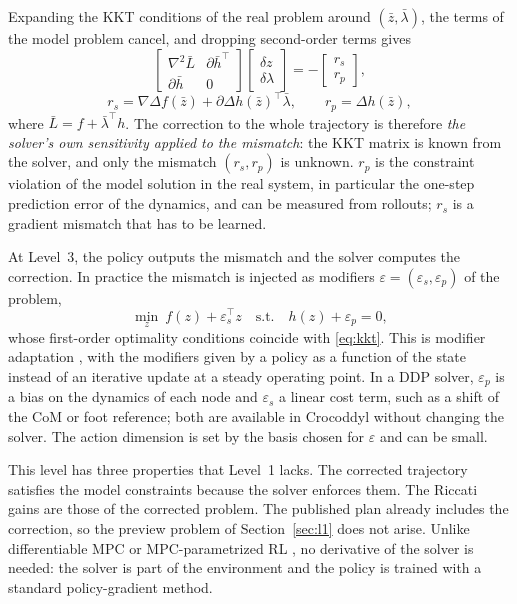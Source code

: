 \documentclass[conference]{IEEEtran}
\newcommand{\T}{^{\top}}
\newcommand{\zb}{\bar{z}}
\newcommand{\lb}{\bar{\lambda}}
\begin{document}
Expanding the KKT conditions of the real problem around $(\zb,\lb)$, the terms of the model problem cancel, and dropping second-order terms gives
\begin{equation}
\begin{bmatrix}\nabla^2\bar L&\partial\bar h\T\\ \partial\bar h&0\end{bmatrix}
\begin{bmatrix}\delta z\\ \delta\lambda\end{bmatrix}
=-\begin{bmatrix}r_s\\ r_p\end{bmatrix},
\label{eq:kkt}
\end{equation}
\begin{equation}
r_s=\nabla\Delta f(\zb)+\partial\Delta h(\zb)\T\lb,\qquad r_p=\Delta h(\zb),
\end{equation}
where $\bar L=f+\lb\T h$.
The correction to the whole trajectory is therefore \emph{the solver's own sensitivity applied to the mismatch}: the KKT matrix is known from the solver, and only the mismatch $(r_s,r_p)$ is unknown.
$r_p$ is the constraint violation of the model solution in the real system, in particular the one-step prediction error of the dynamics, and can be measured from rollouts; $r_s$ is a gradient mismatch that has to be learned.

At Level~3, the policy outputs the mismatch and the solver computes the correction.
In practice the mismatch is injected as modifiers $\varepsilon=(\varepsilon_s,\varepsilon_p)$ of the problem,
\begin{equation}
\min_z\ f(z)+\varepsilon_s\T z\quad\text{s.t.}\quad h(z)+\varepsilon_p=0 ,
\label{eq:modified}
\end{equation}
whose first-order optimality conditions coincide with \eqref{eq:kkt}.
This is modifier adaptation \cite{marchetti2009modifier}, with the modifiers given by a policy as a function of the state instead of an iterative update at a steady operating point.
In a DDP solver, $\varepsilon_p$ is a bias on the dynamics of each node and $\varepsilon_s$ a linear cost term, such as a shift of the CoM or foot reference; both are available in Crocoddyl without changing the solver.
The action dimension is set by the basis chosen for $\varepsilon$ and can be small.

This level has three properties that Level~1 lacks.
The corrected trajectory satisfies the model constraints because the solver enforces them.
The Riccati gains are those of the corrected problem.
The published plan already includes the correction, so the preview problem of Section~\ref{sec:l1} does not arise.
Unlike differentiable MPC \cite{amos2018diffmpc,romero2024acmpc} or MPC-parametrized RL \cite{gros2020nmpcrl}, no derivative of the solver is needed: the solver is part of the environment and the policy is trained with a standard policy-gradient method.
\end{document}
